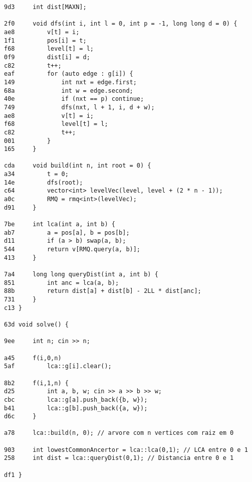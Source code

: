 \documentclass[11pt, a4paper, twoside]{article}
\begin{document}
\begin{lstlisting}
9d3     int dist[MAXN];
    
2f0     void dfs(int i, int l = 0, int p = -1, long long d = 0) {
ae8         v[t] = i;
1f1         pos[i] = t;
f68         level[t] = l;
0f9         dist[i] = d;
c82         t++;
eaf         for (auto edge : g[i]) {
149             int nxt = edge.first;
68a             int w = edge.second;
40e             if (nxt == p) continue;
749             dfs(nxt, l + 1, i, d + w);
ae8             v[t] = i;
f68             level[t] = l;
c82             t++;
001         }
165     }
        
cda     void build(int n, int root = 0) {
a34         t = 0;
14e         dfs(root);
c64         vector<int> levelVec(level, level + (2 * n - 1));
a0c         RMQ = rmq<int>(levelVec);
d91     }
        
7be     int lca(int a, int b) {
ab7         a = pos[a], b = pos[b];
d11         if (a > b) swap(a, b);
544         return v[RMQ.query(a, b)];
413     }
        
7a4     long long queryDist(int a, int b) {
851         int anc = lca(a, b);
88b         return dist[a] + dist[b] - 2LL * dist[anc];
731     }
c13 }

63d void solve() {
    	
9ee 	int n; cin >> n;
    
a45 	f(i,0,n)
5af 		lca::g[i].clear();
    	
8b2 	f(i,1,n) {
d25 		int a, b, w; cin >> a >> b >> w;
cbc 		lca::g[a].push_back({b, w});
b41 		lca::g[b].push_back({a, w});
d6c 	}
    	
a78 	lca::build(n, 0); // arvore com n vertices com raiz em 0
    
903 	int lowestCommonAncertor = lca::lca(0,1); // LCA entre 0 e 1
258 	int dist = lca::queryDist(0,1); // Distancia entre 0 e 1
    
df1 }
\end{lstlisting}
\end{document}
